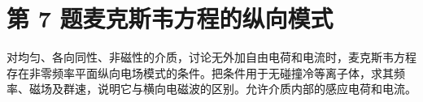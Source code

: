 \documentclass[UTF8,fontset=fandol,a4paper,11pt]{ctexart}
\begin{document}


\section*{第 7 题\quad 麦克斯韦方程的纵向模式}\label{q:7}

对均匀、各向同性、非磁性的介质，讨论无外加自由电荷和电流时，麦克斯韦方程存在非零频率平面纵向电场模式的条件。把条件用于无碰撞冷等离子体，求其频率、磁场及群速，说明它与横向电磁波的区别。允许介质内部的感应电荷和电流。

\begin{center}\begin{minipage}{.98\linewidth}\centering
\begin{tikzpicture}[scale=.9,transform shape]

\end{tikzpicture}
\end{minipage}
\end{center}
\end{document}
